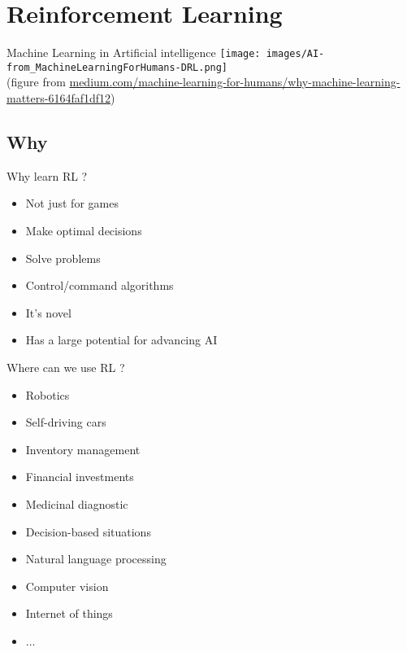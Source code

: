 \documentclass[12pt,serif,mathserif,compress]{beamer}
\title[\hspace*{.5\linewidth}\insertframenumber/\inserttotalframenumber]
      {\fontsize{17}{17}\selectfont{Understanding \& using \\[2mm] \textbf{Deep Reinforcement Learning (DRL)}}}
\subtitle{Season 2 -- DQN algorithm}
\author[JLC -- {\tiny{nov 2018}} \hfill]{{Jean-Luc.Charles\,@\,ENSAM.EU}\\[1mm]\texttt{[image: images/Logo\_AMPT\_Bordeaux-2.png]}}
\institute{}
\date{}
\begin{document}
\frame[plain]{\titlepage}


\section{Reinforcement Learning}

\begin{frame}{Machine Learning in Artificial intelligence}
  \texttt{[image: images/AI-from\_MachineLearningForHumans-DRL.png]}\\
  {\centering\tiny (figure from \href{https://medium.com/machine-learning-for-humans/why-machine-learning-matters-6164faf1df12}
                  {medium.com/machine-learning-for-humans/why-machine-learning-matters-6164faf1df12})}
\end{frame}

\subsection*{Why}

\begin{frame}{Why learn RL ?}
  \begin{itemize}
  \item <1-> Not just for games
  \item <1-> Make optimal decisions
  \item <1-> Solve problems
  \item <1-> Control/command algorithms
  \item <1-> It's novel
  \item <1-> Has a large potential for advancing AI
  \end{itemize}
\end{frame}

\begin{frame}{Where can we use RL ?}
  \begin{itemize}
  \item <1-> Robotics 
  \item <1-> Self-driving cars
  \item <1-> Inventory management
  \item <1-> Financial investments
  \item <1-> Medicinal diagnostic
  \item <1-> Decision-based situations
  \item <1-> Natural language processing
  \item <1-> Computer vision
  \item <1-> Internet of things
  \item <1-> ...
  \end{itemize}
\end{frame}
\end{document}
